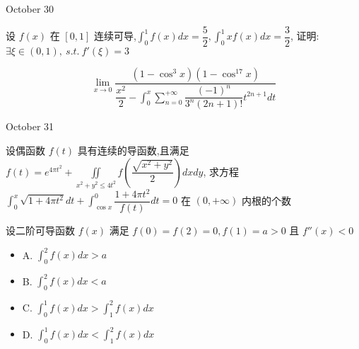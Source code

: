 \begin{solution}
	
\end{solution}


\textcolor{purplea}{October 30}

\begin{example}[][Exam: 36.4.17]
	设 $f(x)$ 在 $[0,1]$ 连续可导,$\int_{0}^{1}f(x)dx=\dfrac{5}{2}, \int_{0}^{1}xf(x)dx=\dfrac{3}{2}$,
	证明: $\exists \xi\in(0,1),\ s.t.\ f'(\xi)=3$
\end{example}
\begin{solution}
	
\end{solution}

\begin{example}[][Exam: 36.4.18]
	$$\lim\limits_{x\to 0 }\dfrac{(1-\cos^3 x)(1-\cos^{17} x)}{\dfrac{x^2}{2}-\int_{0}^{x}\sum\limits_{n=0}^{+\infty}\dfrac{(-1)^n}{3^n(2n+1)!}t^{2n+1}dt}$$
\end{example}

\begin{solution}
	
\end{solution}


\textcolor{purplea}{October 31}

\begin{example}[][Exam: 36.4.19]
	设偶函数 $f(t)$ 具有连续的导函数,且满足 $f(t)=e^{4\pi t^2}+\iint\limits_{x^2+y^2\leq 4t^2}f(\dfrac{\sqrt{x^2+y^2}}{2})dxdy$,
	求方程 $\int_{0}^{x}\sqrt{1+4\pi t^2}dt+\int_{\cos x}^{0}\dfrac{1+4\pi t^2}{f(t)}dt=0$ 在 $(0,+\infty)$ 内根的个数
\end{example}
\begin{solution}
	
\end{solution}

\begin{example}[][Exam: 36.4.20]
	设二阶可导函数 $f(x)$ 满足 $f(0)=f(2)=0, f(1)=a>0$ 且 $f''(x)<0$
\begin{itemize}
	\item A. $\int_{0}^{2}f(x)dx>a$
	\item B. $\int_{0}^{2}f(x)dx<a$
	\item C. $\int_{0}^{1}f(x)dx>\int_{1}^{2}f(x)dx$
	\item D. $\int_{0}^{1}f(x)dx<\int_{1}^{2}f(x)dx$
\end{itemize}
\end{example}

\begin{solution}
	
\end{solution}
